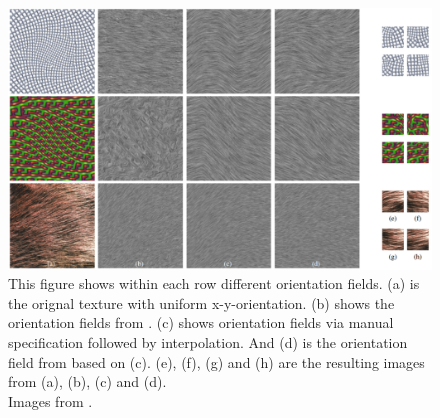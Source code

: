 \begin{figure}[h]
\centering
\includegraphics[scale=0.4]{img/orientationfield}
\caption[Orientation field]{This figure shows within each row different orientation fields. (a) is the orignal texture with uniform x-y-orientation. (b) shows the orientation fields from \cite{paris}. (c) shows orientation fields via manual specification followed by interpolation. And (d) is the orientation field from \cite{its} based on (c). (e), (f), (g) and (h) are the resulting images from (a), (b), (c) and (d).\\ Images from \cite{its}.}
\label{fig:Orientation field}
\end{figure}
\pagebreak

